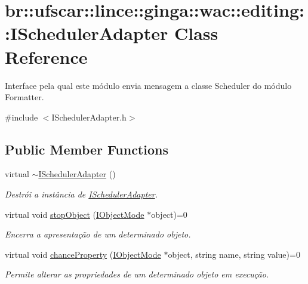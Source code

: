 \hypertarget{classbr_1_1ufscar_1_1lince_1_1ginga_1_1wac_1_1editing_1_1ISchedulerAdapter}{
\section{br::ufscar::lince::ginga::wac::editing::ISchedulerAdapter Class Reference}
\label{classbr_1_1ufscar_1_1lince_1_1ginga_1_1wac_1_1editing_1_1ISchedulerAdapter}
}


Interface pela qual este módulo envia mensagem a classe Scheduler do módulo Formatter.  




{\ttfamily \#include $<$ISchedulerAdapter.h$>$}

\subsection*{Public Member Functions}
\begin{DoxyCompactItemize}
\item 
virtual \hyperlink{classbr_1_1ufscar_1_1lince_1_1ginga_1_1wac_1_1editing_1_1ISchedulerAdapter_a907bf3b317e57ea1ceb2512d40581070}{$\sim$ISchedulerAdapter} ()
\begin{DoxyCompactList}\small\item\em Destrói a instância de \hyperlink{classbr_1_1ufscar_1_1lince_1_1ginga_1_1wac_1_1editing_1_1ISchedulerAdapter}{ISchedulerAdapter}. \item\end{DoxyCompactList}\item 
virtual void \hyperlink{classbr_1_1ufscar_1_1lince_1_1ginga_1_1wac_1_1editing_1_1ISchedulerAdapter_ac9176e8b3c85cfc3fce05bbcb2285bd1}{stopObject} (\hyperlink{classbr_1_1ufscar_1_1lince_1_1ginga_1_1wac_1_1editing_1_1IObjectMode}{IObjectMode} $\ast$object)=0
\begin{DoxyCompactList}\small\item\em Encerra a apresentação de um determinado objeto. \item\end{DoxyCompactList}\item 
virtual void \hyperlink{classbr_1_1ufscar_1_1lince_1_1ginga_1_1wac_1_1editing_1_1ISchedulerAdapter_a689421a01c70c7915af5a03ee7fc681a}{chanceProperty} (\hyperlink{classbr_1_1ufscar_1_1lince_1_1ginga_1_1wac_1_1editing_1_1IObjectMode}{IObjectMode} $\ast$object, string name, string value)=0
\begin{DoxyCompactList}\small\item\em Permite alterar as propriedades de um determinado objeto em execução. \item\end{DoxyCompactList}\end{DoxyCompactItemize}



